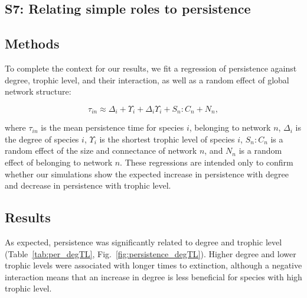 \documentclass[12pt]{article}
\begin{document}
\begin{spacing}{2.0}
\clearpage


\section*{S7: Relating simple roles to persistence}

	\subsection*{Methods}

            To complete the context for our results, we fit a regression of persistence against degree, trophic level, and their interaction, as well as a random effect of global network structure:
            
            \begin{equation}
                \tau_{in} \approx \Delta_{i} + \Upsilon_{i} + \Delta_{i}\Upsilon_{i} + S_{n}:C_{n} + N_n ,
                \label{eq:persistence_degTL}
            \end{equation}
            
            \noindent where $\tau_{in}$ is the mean persistence time for species $i$, belonging to network $n$, $\Delta_i$ is the degree of species $i$, $\Upsilon_i$ is the shortest trophic level of species $i$, $S_{n}:C_{n}$ is a random effect of the size and connectance of network $n$, and $N_n$ is a random effect of belonging to network $n$.
            These regressions are intended only to confirm whether our simulations show the expected increase in persistence with degree and decrease in persistence with trophic level.

	\subsection*{Results}

		As expected, persistence was significantly related to degree and trophic level (Table~\ref{tab:per_degTL}, Fig.~\ref{fig:persistence_degTL}).
		Higher degree and lower trophic levels were associated with longer times to extinction, although a negative interaction means that an increase in degree is less beneficial for species with high trophic level.



\end{spacing}
\end{document}
